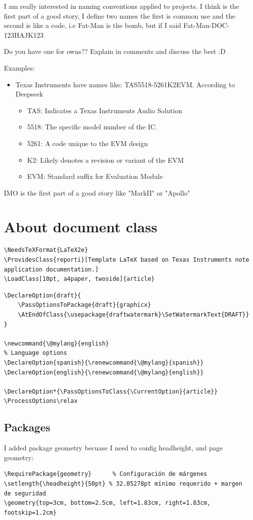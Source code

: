 \documentclass[english]{reporti}
\begin{document}
I am really interested in naming conventions applied to projects. I think is the first part of a good story, I define two names the first is common use and the second is like a code, i.e Fat-Man is the bomb, but if I said Fat-Man-DOC-123HAJK123

Do you have one for owns?? Explain in comments and discuss the best :D

Examples:
\begin{itemize}
\item Texas Instruments have names like: TAS5518-5261K2EVM. According to Deepseek
\begin{itemize}
\item TAS: Indicates a Texas Instruments Audio Solution
\item 5518: The specific model number of the IC.
\item 5261: A code unique to the EVM design
\item K2: Likely denotes a revision or variant of the EVM
\item EVM: Standard suffix for Evaluation Module
\end{itemize}
\end{itemize}

IMO is the first part of a good story like "MarkII" or "Apollo"


\section{About document class}
\label{sec:orga42a8be}

\begin{verbatim}
\NeedsTeXFormat{LaTeX2e}
\ProvidesClass{reporti}[Template LaTeX based on Texas Instruments note application documentation.]
\LoadClass[10pt, a4paper, twoside]{article}
\end{verbatim}

\begin{verbatim}
\DeclareOption{draft}{
    \PassOptionsToPackage{draft}{graphicx}
    \AtEndOfClass{\usepackage{draftwatermark}\SetWatermarkText{DRAFT}}
}

\newcommand{\@mylang}{english}
% Language options
\DeclareOption{spanish}{\renewcommand{\@mylang}{spanish}}
\DeclareOption{english}{\renewcommand{\@mylang}{english}}

\DeclareOption*{\PassOptionsToClass{\CurrentOption}{article}}
\ProcessOptions\relax
\end{verbatim}

\subsection{Packages}
\label{sec:org978f93b}
I added package geometry becuase I need to config headheight, and page geometry:
\begin{verbatim}
\RequirePackage{geometry}      % Configuración de márgenes
\setlength{\headheight}{50pt} % 32.05278pt mínimo requerido + margen de seguridad
\geometry{top=3cm, bottom=2.5cm, left=1.83cm, right=1.83cm, footskip=1.2cm}
\end{verbatim}
\end{document}

